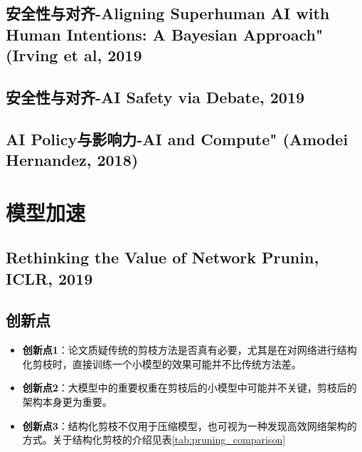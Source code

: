 \documentclass[twocolumn, 10pt]{article} %
\begin{document}
\subsection{安全性与对齐-Aligning Superhuman AI with Human Intentions: A Bayesian Approach" (Irving et al, 2019}

\subsection{安全性与对齐-AI Safety via Debate, 2019}



\subsection{AI Policy与影响力-AI and Compute" (Amodei  Hernandez, 2018)}



\section{模型加速}
\subsection{Rethinking the Value of Network Prunin, ICLR, 2019}

\subsection{创新点}

\begin{itemize}[left=2em] %
    \item \textbf{创新点1}：论文质疑传统的剪枝方法是否真有必要，尤其是在对网络进行结构化剪枝时，直接训练一个小模型的效果可能并不比传统方法差。

    \item \textbf{创新点2}：大模型中的重要权重在剪枝后的小模型中可能并不关键，剪枝后的架构本身更为重要。

    \item \textbf{创新点3}：结构化剪枝不仅用于压缩模型，也可视为一种发现高效网络架构的方式。关于结构化剪枝的介绍见表\ref{tab:pruning_comparison}
\end{itemize}
\end{document}
